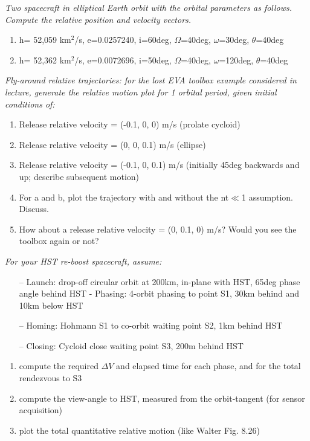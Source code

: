 \documentclass[onecolumn,10pt]{jhwhw}
\begin{document}
\problem{}
\textit{Two spacecraft in elliptical Earth orbit with the orbital parameters as follows. Compute the relative position and velocity vectors.}
\begin{enumerate}
\itemsep0em
\item h= 52,059 km$^2$/s, e=0.0257240, i=60deg, $\Omega$=40deg, $\omega$=30deg, $\theta$=40deg
\item h= 52,362 km$^2$/s, e=0.0072696, i=50deg, $\Omega$=40deg, $\omega$=120deg, $\theta$=40deg
\end{enumerate}
\clearpage

\problem{}
\textit{Fly-around relative trajectories: for the lost EVA toolbox example considered in lecture, generate the relative motion plot for 1 orbital period, given initial conditions of:}
\begin{enumerate}
\itemsep0em
\item Release relative velocity = (-0.1, 0, 0) m/s (prolate cycloid)
\item Release relative velocity = (0, 0, 0.1) m/s (ellipse)
\item Release relative velocity = (-0.1, 0, 0.1) m/s (initially 45deg backwards and up; describe subsequent motion)
\item For a and b, plot the trajectory with and without the nt$\ll$1 assumption. Discuss.
\item How about a release relative velocity = (0, 0.1, 0) m/s? Would you see the toolbox again or not?
\end{enumerate}
\clearpage

\problem{}
\textit{For your HST re-boost spacecraft, assume:}
\begin{itemize}
\itemsep0em
\item[--] Launch: drop-off circular orbit at 200km, in-plane with HST, 65deg phase angle behind HST - Phasing: 4-orbit phasing to point S1, 30km behind and 10km below HST
\item[--] Homing: Hohmann S1 to co-orbit waiting point S2, 1km behind HST
\item[--] Closing: Cycloid close waiting point S3, 200m behind HST
\end{itemize}
\begin{enumerate}
\itemsep0em
\item compute the required $\Delta V$ and elapsed time for each phase, and for the total rendezvous to S3
\item compute the view-angle to HST, measured from the orbit-tangent (for sensor acquisition)
\item plot the total quantitative relative motion (like Walter Fig. 8.26)
\end{enumerate}
\end{document}
